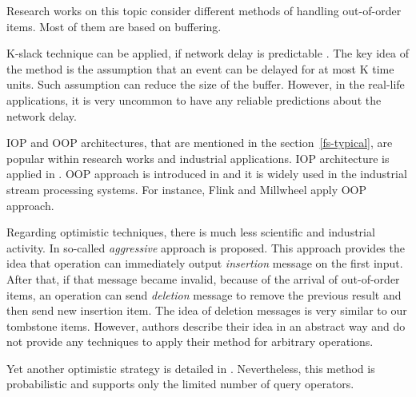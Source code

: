 
\label {fs-related}

Research works on this topic consider different methods of handling out-of-order items. Most of them are based on buffering.

K-slack technique can be applied, if network delay is predictable \cite{Babu:2004:EKC:1016028.1016032, Li:2007:ESP:1270388.1270975}. The key idea of the method is the assumption that an event can be delayed for at most K time units. Such assumption can reduce the size of the buffer. However, in the real-life applications, it is very uncommon to have any reliable predictions about the network delay.

IOP and OOP architectures, that are mentioned in the section~\ref{fs-typical}, are popular within research works and industrial applications. IOP architecture is applied in \cite{Cranor:2003:GSD:872757.872838, Abadi:2003:ANM:950481.950485, Arasu:2006:CCQ:1146461.1146463, Ding:2004:EWJ:1031171.1031189, Hammad:2003:SSW:1315451.1315478, Hammad:2005:OIE:1116877.1116897}. OOP approach is introduced in \cite{Li:2008:OPN:1453856.1453890} and it is widely used in the industrial stream processing systems. For instance, Flink \cite{carbone2015apache} and Millwheel \cite{Akidau:2013:MFS:2536222.2536229} apply OOP approach.

Regarding optimistic techniques, there is much less scientific and industrial activity. In \cite{Wei:2009:SSO:1559845.1559973} so-called {\it aggressive} approach is proposed. This approach provides the idea that operation can immediately output {\it insertion} message on the first input. After that, if that message became invalid, because of the arrival of out-of-order items, an operation can send {\it deletion} message to remove the previous result and then send new insertion item. The idea of deletion messages is very similar to our tombstone items. However, authors describe their idea in an abstract way and do not provide any techniques to apply their method for arbitrary operations.

Yet  another  optimistic strategy is detailed in \cite{Li2011}. Nevertheless, this method is probabilistic and supports only the limited number of query operators.